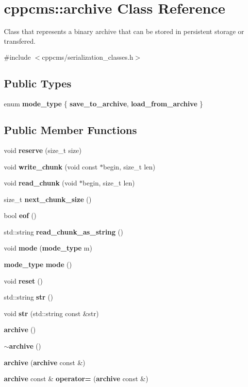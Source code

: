 \section{cppcms\+:\+:archive Class Reference}
\label{classcppcms_1_1archive}


Class that represents a binary archive that can be stored in persistent storage or transfered.  




{\ttfamily \#include $<$cppcms/serialization\+\_\+classes.\+h$>$}

\subsection*{Public Types}
\begin{DoxyCompactItemize}
\item 
enum {\bf mode\+\_\+type} \{ {\bfseries save\+\_\+to\+\_\+archive}, 
{\bfseries load\+\_\+from\+\_\+archive}
 \}
\end{DoxyCompactItemize}
\subsection*{Public Member Functions}
\begin{DoxyCompactItemize}
\item 
void {\bf reserve} (size\+\_\+t size)
\item 
void {\bf write\+\_\+chunk} (void const $\ast$begin, size\+\_\+t len)
\item 
void {\bf read\+\_\+chunk} (void $\ast$begin, size\+\_\+t len)
\item 
size\+\_\+t {\bf next\+\_\+chunk\+\_\+size} ()
\item 
bool {\bf eof} ()
\item 
std\+::string {\bf read\+\_\+chunk\+\_\+as\+\_\+string} ()
\item 
void {\bf mode} ({\bf mode\+\_\+type} m)
\item 
{\bf mode\+\_\+type} {\bf mode} ()
\item 
void {\bf reset} ()
\item 
std\+::string {\bf str} ()
\item 
void {\bf str} (std\+::string const \&str)
\item 
{\bf archive} ()
\item 
{\bf $\sim$archive} ()
\item 
{\bf archive} ({\bf archive} const \&)
\item 
{\bf archive} const \& {\bf operator=} ({\bf archive} const \&)
\end{DoxyCompactItemize}



